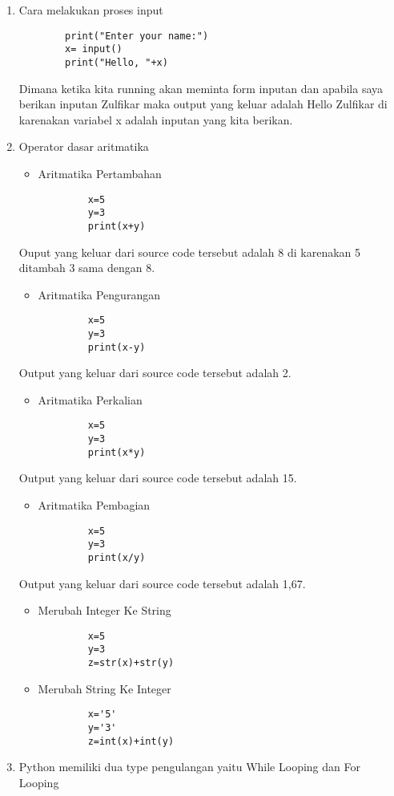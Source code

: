 \begin{enumerate}
\par
\item Cara melakukan proses input
	\begin{verbatim}
		print("Enter your name:")
		x= input()
		print("Hello, "+x)
	\end{verbatim}
\subitem Dimana ketika kita running akan meminta form inputan dan apabila saya berikan inputan Zulfikar maka output yang keluar adalah Hello Zulfikar di karenakan variabel x adalah inputan yang kita berikan.
\par
\item Operator dasar aritmatika
 	\begin{itemize}
	\item Aritmatika Pertambahan
	\end{itemize}
		\begin{verbatim}
			x=5
			y=3
			print(x+y)
		\end{verbatim}
	\subitem Ouput yang keluar dari source code tersebut adalah 8 di karenakan 5 ditambah 3 sama dengan 8.
	\begin{itemize}
	\item Aritmatika Pengurangan
	\end{itemize}	
		\begin{verbatim}
			x=5
			y=3
			print(x-y)
		\end{verbatim}
	\subitem Output yang keluar dari source code tersebut adalah 2.
	\begin{itemize}
	\item Aritmatika Perkalian
	\end{itemize}
		\begin{verbatim}
			x=5
			y=3
			print(x*y)
		\end{verbatim}
	\subitem Output yang keluar dari source code tersebut adalah 15.
	\begin{itemize}
	\item Aritmatika Pembagian
	\end{itemize}
		\begin{verbatim}
			x=5
			y=3
			print(x/y)
		\end{verbatim}
	\subitem Output yang keluar dari source code tersebut adalah 1,67.
	\begin{itemize}
	\item Merubah Integer Ke String
	\end{itemize}
		\begin{verbatim}
			x=5
			y=3
			z=str(x)+str(y)
		\end{verbatim}
	\begin{itemize}
	\item Merubah String Ke Integer
	\end{itemize}
		\begin{verbatim}
			x='5'
			y='3'
			z=int(x)+int(y)
		\end{verbatim}
\par
\item Python memiliki dua type pengulangan yaitu While Looping dan For Looping


\end{enumerate}

